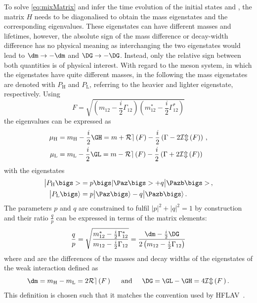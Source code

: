 To solve \cref{eq:mixMatrix} and infer the time evolution of the initial states \Paz and \Pazb, the matrix $H$ needs to be diagonalised to obtain the mass eigenstates and the corresponding eigenvalues.
These eigenstates can have different masses and lifetimes, however, the absolute sign of the mass difference \dm or decay-width difference \DG has no physical meaning as interchanging the two eigenstates would lead to $\dm\to-\dm$ and $\DG\to-\DG$.
Instead, only the relative sign between both quantities is of physical interest.
With regard to the \Bz meson system, in which the eigenstates have quite different masses, in the following the mass eigenstates are denoted with $P_\text{H}$ and $P_\text{L}$, referring to the heavier and lighter eigenstate, respectively.
Using
\begin{equation}
F=\sqrt{\left(m_{12}-\frac{i}{2}\Gamma_{12}\right)\left(m_{12}^\ast-\frac{i}{2}\Gamma_{12}^\ast\right)}
\end{equation}
the eigenvalues can be expressed as
\begin{equation}
\begin{split}
\mu_\text{H} &= m_\text{H}-\frac{i}{2}\GH = m + \mathcal{R{}e}\left(F\right)-\frac{i}{2}\left(\Gamma-2\mathcal{I{}m}\left(F\right)\right)\,,\\
\mu_\text{L} &= m_\text{L}-\frac{i}{2}\GL = m - \mathcal{R{}e}\left(F\right)-\frac{i}{2}\left(\Gamma+2\mathcal{I{}m}\left(F\right)\right)\label{eq:Mass_eigenvalues}
\end{split}
\end{equation}
with the eigenstates
\begin{equation}
\begin{split}
\big|P_\text{H}\bigs>&= p\bigs|\Paz\bigs>+q\big|\Pazb\bigs>\,,\\
\big|P_\text{L}\bigs\rangle&= p\big|\Paz\bigs\rangle-q\big|\Pazb\bigs\rangle\,.\label{eq:Mass_eigenstates}
\end{split}
\end{equation}
The parameters $p$ and $q$ are constrained to fulfil $\left|p\right|^2\!+\left|q\right|^2=1$ by construction and their ratio $\frac{q}{p}$ can be expressed in terms of the matrix elements:
\begin{equation}
\frac{q}{p}=\sqrt{ \frac{ m_{12}^\ast-\frac{i}{2}\Gamma_{12}^\ast }{ m_{12}-\frac{i}{2}\Gamma_{12} }}
=\frac{\dm-\frac{i}{2}\DG}{2\left(m_{12}-\frac{i}{2}\Gamma_{12}\right)}\label{eq:qoverp}
\end{equation}
where \dm and \DG are the differences of the masses and decay widths of the eigenstates of the weak interaction defined as
\begin{equation}
\dm=m_\text{H}-m_\text{L}=2\mathcal{R{}e}\left(F\,\right)\hspace{0.5cm}\text{and}\hspace{0.5cm}\DG=\GL-\GH=4\mathcal{I{}m}\left(F\,\right).\label{eq:define_dmAndDG}
\end{equation}
This definition is chosen such that it matches the convention used by \ac{HFLAV}~\cite{HFLAV2016}.

